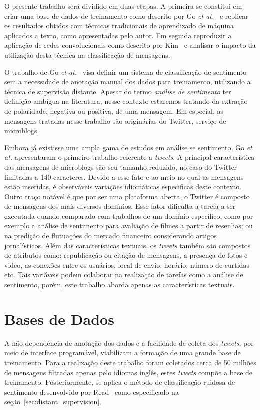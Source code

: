 O presente trabalho será dividido em duas etapas.
A primeira se constitui em criar uma base de dados de treinamento como descrito por Go \textit{et at.}~\cite{go09} e
replicar os resultados obtidos com técnicas tradicionais de aprendizado de máquina aplicados a texto, como apresentadas
pelo autor.
Em seguida reproduzir a aplicação de redes convolucionais como descrito por Kim~\cite{kim14} e analisar o impacto da
utilização desta técnica na classificação de mensagens.

O trabalho de Go \textit{et at.}~\cite{go09} visa definir um sistema de classificação de sentimento sem a necessidade de
anotação manual dos dados para treinamento, utilizando a técnica de supervisão distante.
Apesar do termo \textit{análise de sentimento} ter definição ambígua na literatura, nesse contexto estaremos tratando da
extração de polaridade, negativa ou positiva, de uma mensagem.
Em especial, as mensagens tratadas nesse trabalho são originárias do Twitter, serviço de microblogs.

Embora já existisse uma ampla gama de estudos em análise se sentimento, Go \textit{et at.} apresentaram o primeiro
trabalho referente a \textit{tweets}.
A principal característica das mensagens de microblogs são seu tamanho reduzido, no caso do Twitter limitadas a
140 caracteres.
Devido a esse fato e ao meio no qual as mensagens estão inseridas, é observáveis variações idiomáticas especificas deste
contexto.
Outro traço notável é que por ser uma plataforma aberta, o Twitter é composto de mensagens dos mais diversos domínios.
Esse fator dificulta a tarefa a ser executada quando comparado com trabalhos de um domínio específico, como por exemplo
a análise de sentimento para avaliação de filmes a partir de resenhas; ou na predição de flutuações do mercado financeiro
considerando artigos jornalísticos.
Além das características textuais, os \textit{tweets} também são compostos de atributos como: republicação ou citação de
mensagens, a presença de fotos e video, as conexões entre os usuários, local de envio, horário, número de curtidas etc.
Tais variáveis podem colaborar na realização de tarefas como a análise de sentimento, porém, este trabalho aborda apenas
as características textuais.

\section{Bases de Dados}

A não dependência de anotação dos dados e a facilidade de coleta dos \textit{tweets}, por meio de interface programável,
viabilizam a formação de uma grande base de treinamento.
Para a realização deste trabalho foram coletados cerca de 50 milhões de mensagens filtradas apenas pelo idiomas inglês,
estes \textit{tweets} compõe a base de treinamento.
Posteriormente, se aplica o método de classificação ruidosa de sentimento desenvolvido por Read~\cite{read05} como
especificado na seção~\ref{sec:distant_supervision}.

